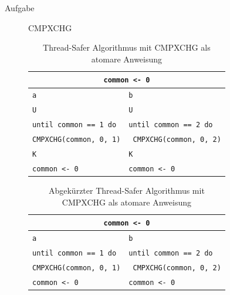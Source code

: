 \documentclass[a4paper,twoside,12pt,fleqn]{article}
\newcounter{AUFGNR}
\newcommand{\AUFGABE}[2]{\vspace{0.3cm}\item[Aufgabe~\arabic{AUFGNR}]\stepcounter{AUFGNR} #1\hfill\emph{#2}}
\begin{document}
\begin{description}
	\AUFGABE{CMPXCHG}{}
	\begin{table}[h]
		\centering
		\begin{tabularx}{0.75\textwidth}{l | l}
			\multicolumn{2}{c}{\texttt{common <- 0}}                                                 \\
			\hline
			\texttt{a}                                 & \texttt{b}                                  \\
			\hline
			\texttt{U}                                 & \texttt{U}                                  \\
			\texttt{until common == 1 do}              & \texttt{until common == 2 do}               \\
			\texttt{\hspace{2em}CMPXCHG(common, 0, 1)} & \texttt{\hspace{2em} CMPXCHG(common, 0, 2)} \\
			\texttt{K}                                 & \texttt{K}                                  \\
			\texttt{common <- 0}                       & \texttt{common <- 0}                        \\
		\end{tabularx}
		\caption{Thread-Safer Algorithmus mit CMPXCHG als atomare Anweisung}
	\end{table}

	\begin{table}[h]
		\centering
		\begin{tabularx}{0.75\textwidth}{l | l}
			\multicolumn{2}{c}{\texttt{common <- 0}}                                                 \\
			\hline
			\texttt{a}                                 & \texttt{b}                                  \\
			\hline
			\texttt{until common == 1 do}              & \texttt{until common == 2 do}               \\
			\texttt{\hspace{2em}CMPXCHG(common, 0, 1)} & \texttt{\hspace{2em} CMPXCHG(common, 0, 2)} \\
			\texttt{common <- 0}                       & \texttt{common <- 0}                        \\
		\end{tabularx}
		\caption{Abgekürzter Thread-Safer Algorithmus mit CMPXCHG als atomare Anweisung}
	\end{table}


\end{description}
\end{document}
